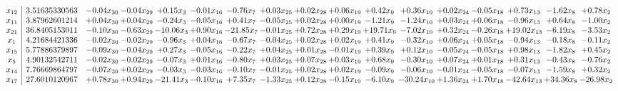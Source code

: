 \documentclass[9pt]{article}
\begin{document}
 \[\begin{array}{c| c c@{\hskip 2pt} c@{\hskip 2pt} c@{\hskip 2pt} c@{\hskip 2pt} c@{\hskip 2pt} c@{\hskip 2pt} c@{\hskip 2pt} c@{\hskip 2pt} c@{\hskip 2pt} c@{\hskip 2pt} c@{\hskip 2pt} c@{\hskip 2pt} c@{\hskip 2pt} c@{\hskip 2pt} c@{\hskip 2pt} }
 x_{12}   &  3.51635330563 & -0.04 x_{30} & -0.04 x_{29} & +  0.15 x_{3} & -0.01 x_{16} & -0.76 x_{7} & +  0.03 x_{25} & +  0.02 x_{28} & +  0.06 x_{19} & +  0.42 x_{9} & +  0.36 x_{10} & +  0.02 x_{24} & -0.05 x_{18} & +  0.73 x_{13} & -1.62 x_{8} & +  0.78 x_{2}\\
 x_{11}   &  3.87962601214 & +  0.04 x_{30} & +  0.04 x_{29} & -0.24 x_{3} & -0.05 x_{16} & +  0.41 x_{7} & -0.05 x_{25} & +  0.02 x_{28} & +  0.00 x_{19} & -1.21 x_{9} & -1.24 x_{10} & +  0.03 x_{24} & +  0.06 x_{18} & -0.96 x_{13} & +  0.64 x_{8} & -1.00 x_{2}\\
 x_{21}   &  36.8405153011 & -0.10 x_{30} & -0.63 x_{29} & -10.06 x_{3} & +  0.90 x_{16} & -21.85 x_{7} & -0.01 x_{25} & +  0.72 x_{28} & +  0.29 x_{19} & + 19.71 x_{9} & -7.02 x_{10} & +  0.32 x_{24} & -0.26 x_{18} & + 19.02 x_{13} & -6.19 x_{8} & -3.53 x_{2}\\
 x_{1}   &  4.21684421336 & -0.02 x_{30} & -0.02 x_{29} & -0.96 x_{3} & +  0.04 x_{16} & -0.67 x_{7} & -0.04 x_{25} & +  0.02 x_{28} & +  0.02 x_{19} & +  0.41 x_{9} & -0.32 x_{10} & +  0.06 x_{24} & +  0.05 x_{18} & -0.94 x_{13} & -0.18 x_{8} & -0.11 x_{2}\\
 x_{15}   &  5.77886379897 & -0.09 x_{30} & -0.04 x_{29} & +  0.27 x_{3} & -0.05 x_{16} & -0.22 x_{7} & +  0.04 x_{25} & +  0.01 x_{28} & -0.01 x_{19} & +  0.39 x_{9} & +  0.12 x_{10} & -0.05 x_{24} & -0.05 x_{18} & +  0.98 x_{13} & -1.82 x_{8} & +  0.45 x_{2}\\
 x_{5}   &  4.90132542711 & -0.02 x_{30} & -0.02 x_{29} & -0.07 x_{3} & +  0.01 x_{16} & -0.80 x_{7} & +  0.03 x_{25} & +  0.07 x_{28} & +  0.03 x_{19} & +  0.68 x_{9} & -0.30 x_{10} & +  0.07 x_{24} & +  0.01 x_{18} & +  0.31 x_{13} & -0.43 x_{8} & -0.76 x_{2}\\
 x_{14}   &  7.76669864797 & -0.07 x_{30} & +  0.02 x_{29} & -0.03 x_{3} & -0.03 x_{16} & -0.10 x_{7} & -0.01 x_{25} & +  0.02 x_{28} & +  0.02 x_{19} & -0.09 x_{9} & -0.06 x_{10} & -0.01 x_{24} & -0.05 x_{18} & -0.07 x_{13} & -1.59 x_{8} & +  0.32 x_{2}\\
 x_{17}   &  27.6010120967 & +  0.78 x_{30} & +  0.94 x_{29} & -21.41 x_{3} & -0.10 x_{16} & +  7.35 x_{7} & -1.33 x_{25} & +  0.12 x_{28} & -0.15 x_{19} & -6.10 x_{9} & -30.24 x_{10} & +  1.36 x_{24} & +  1.70 x_{18} & -42.64 x_{13} & + 34.36 x_{8} & -26.98 x_{2}\\

\end{array}\]
\end{document}

